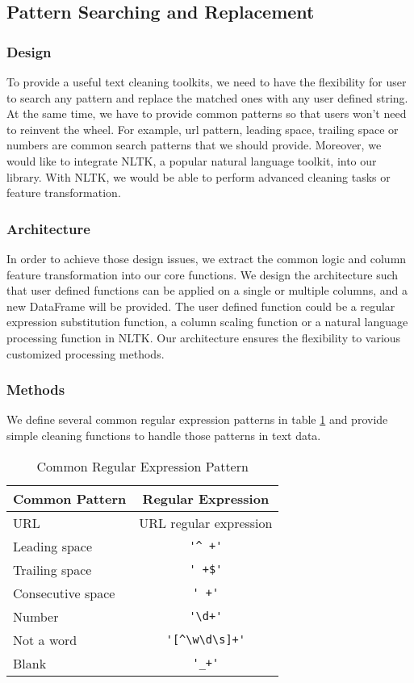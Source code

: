 \documentclass[sigconf]{acmart}
\begin{document}
\subsection{Pattern Searching and Replacement}
\subsubsection{Design} 
To provide a useful text cleaning toolkits, we need to have the flexibility for user to search any pattern and replace the matched ones with any user defined string. At the same time, we have to provide common patterns so that users won't need to reinvent the wheel. For example, url pattern, leading space, trailing space or numbers are common search patterns that we should provide. Moreover, we would like to integrate NLTK\cite{nltk}, a popular natural language toolkit, into our library. With NLTK, we would be able to perform advanced cleaning tasks or feature transformation.

\subsubsection{Architecture}
In order to achieve those design issues, we extract the common logic and column feature transformation into our core functions. We design the architecture such that user defined functions can be applied on a single or multiple columns, and a new DataFrame will be provided. The user defined function could be a regular expression substitution function, a column scaling function or a natural language processing function in NLTK. Our architecture ensures the flexibility to various customized processing methods.

\subsubsection{Methods}
We define several common regular expression patterns in table \ref{tab:reg} and provide simple cleaning functions to handle those patterns in text data.
\begin{table}
\caption{Common Regular Expression Pattern}   
\label{tab:reg}
\begin{tabular}{lc}
	Common Pattern & Regular Expression \\
\hline
	URL & URL regular expression\cite{url} \\
	Leading space & \verb!'^ +'! \\
	Trailing space & \verb!' +$'! \\
	Consecutive space & \verb!' +'! \\
	Number & \verb!'\d+'!  \\
	Not a word & \verb!'[^\w\d\s]+'! \\
	Blank & \verb!'_+'!
\end{tabular}   
\end{table}
\end{document}
